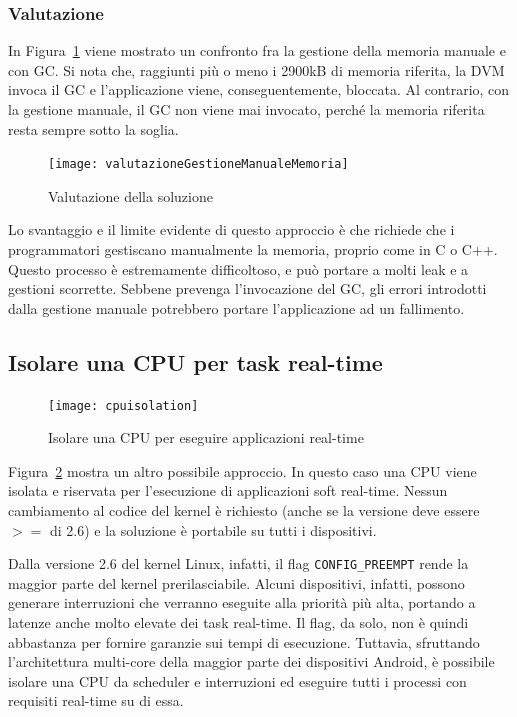 \subsubsection{Valutazione}
In Figura~\ref{fig:valutazionegestionemanualememoria} viene mostrato un confronto fra la gestione della memoria manuale e con GC. Si nota che, raggiunti più o meno i 2900kB di memoria riferita, la DVM invoca il GC e l'applicazione viene, conseguentemente, bloccata. Al contrario, con la gestione manuale, il GC non viene mai invocato, perché la memoria riferita resta sempre sotto la soglia.
\begin{figure}[h]
	\centering
	\texttt{[image: valutazioneGestioneManualeMemoria]}
	\caption{Valutazione della soluzione}
	\label{fig:valutazionegestionemanualememoria}
\end{figure}

Lo svantaggio e il limite evidente di questo approccio è che richiede che i programmatori gestiscano manualmente la memoria, proprio come in C o C++. Questo processo è estremamente difficoltoso, e può portare a molti leak e a gestioni scorrette. Sebbene prevenga l'invocazione del GC, gli errori introdotti dalla gestione manuale potrebbero portare l'applicazione ad un fallimento.

\subsection{Isolare una CPU per task real-time}
\begin{figure}[h]
	\centering
	\texttt{[image: cpuisolation]}
	\caption{Isolare una CPU per eseguire applicazioni real-time}
	\label{fig:cpuisolation}
\end{figure}
Figura~\ref{fig:cpuisolation} mostra un altro possibile approccio. In questo caso una CPU viene isolata e riservata per l'esecuzione di applicazioni soft real-time. Nessun cambiamento al codice del kernel è richiesto (anche se la versione deve essere $>=$ di 2.6) e la soluzione è portabile su tutti i dispositivi.

Dalla versione 2.6 del kernel Linux, infatti, il flag \texttt{CONFIG\_PREEMPT} rende la maggior parte del kernel prerilasciabile. Alcuni dispositivi, infatti, possono generare interruzioni che verranno eseguite alla priorità più alta, portando a latenze anche molto elevate dei task real-time. Il flag, da solo, non è quindi abbastanza per fornire garanzie sui tempi di esecuzione. Tuttavia, sfruttando l'architettura multi-core della maggior parte dei dispositivi Android, è possibile isolare una CPU da scheduler e interruzioni ed eseguire tutti i processi con requisiti real-time su di essa. 

